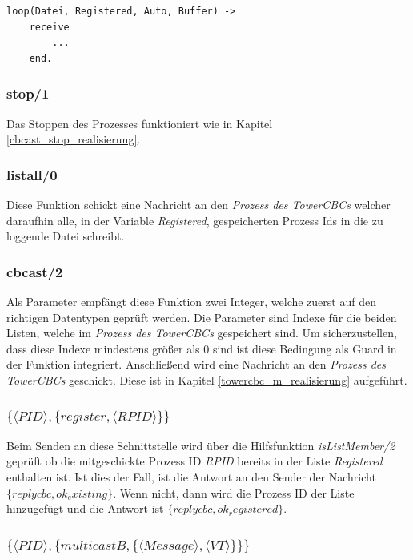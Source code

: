 \begin{lstlisting}
loop(Datei, Registered, Auto, Buffer) ->
    receive
        ...
    end.
\end{lstlisting}

\subsubsection{stop/1}

Das Stoppen des Prozesses funktioniert wie in Kapitel \ref{cbcast_stop_realisierung}.

\subsubsection{listall/0}

Diese Funktion schickt eine Nachricht an den \textit{Prozess des TowerCBCs} welcher daraufhin alle, in der Variable \textit{Registered}, gespeicherten Prozess Ids in die zu loggende Datei schreibt. 

\subsubsection{cbcast/2}

Als Parameter empfängt diese Funktion zwei Integer, welche zuerst auf den richtigen Datentypen geprüft werden. Die Parameter sind Indexe für die beiden Listen, welche im \textit{Prozess des TowerCBCs} gespeichert sind. Um sicherzustellen, dass diese Indexe mindestens größer als 0 sind ist diese Bedingung als Guard in der Funktion integriert. Anschließend wird eine Nachricht an den \textit{Prozess des TowerCBCs} geschickt. Diese ist in Kapitel \ref{towercbc_m_realisierung} aufgeführt.

\subsubsection{$\{\langle PID \rangle,\{register,\langle RPID\rangle\}\}$} \label{towercbc_register_realisierung}

Beim Senden an diese Schnittstelle wird über die Hilfsfunktion \textit{isListMember/2} geprüft ob die mitgeschickte Prozess ID \textit{RPID} bereits in der Liste \textit{Registered} enthalten ist. Ist dies der Fall, ist die Antwort an den Sender der Nachricht $\{replycbc, ok_existing\}$. Wenn nicht, dann wird die Prozess ID der Liste hinzugefügt und die Antwort ist $\{replycbc, ok_registered\}$.

\subsubsection{$\{\langle PID\rangle,\{multicastB,\{\langle Message\rangle,\langle VT\rangle\}\}\}$} \label{towercbc_b_realisierung}

